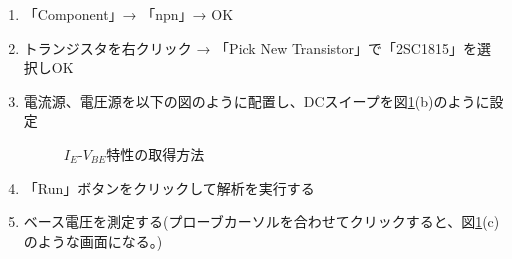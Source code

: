 \begin{enumerate}
  \setlength{\parskip}{0cm} %
  \setlength{\itemsep}{0cm} %
  \item 「Component」→ 「npn」→ OK
  \item トランジスタを右クリック → 「Pick New Transistor」で「2SC1815」を選択しOK
  \item 電流源、電圧源を以下の図のように配置し、DCスイープを図\ref{tejun1}(b)のように設定
  \begin{figure}[htb]
    \begin{center}

    \caption{$I_E$-$V_{BE}$特性の取得方法} 
    \label{tejun1}
    \end{center}
  \end{figure}
  \item 「Run」ボタンをクリックして解析を実行する
  \item ベース電圧を測定する(プローブカーソルを合わせてクリックすると、図\ref{tejun1}(c)のような画面になる。)
\end{enumerate}
